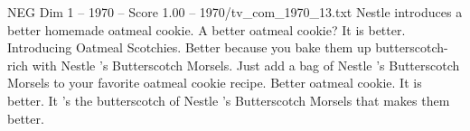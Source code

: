 \begin{textsample}{NEG Dim 1 – 1970 – Score 1.00 – 1970/tv\_com\_1970\_13.txt}  \label{ex:f1_neg_068}
Nestle introduces a better homemade oatmeal cookie.
A better oatmeal cookie?
It is better.
Introducing Oatmeal Scotchies.
Better because you bake them up butterscotch-rich with Nestle 's Butterscotch Morsels.
Just add a bag of Nestle 's Butterscotch Morsels to your favorite oatmeal cookie recipe.
Better oatmeal cookie.
It is better.
It 's the butterscotch of Nestle 's Butterscotch Morsels that makes them better.

\end{textsample}

